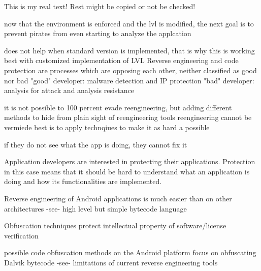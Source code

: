 This is my real text! Rest might be copied or not be checked!


now that the environment is enforced and the lvl is modified, the next goal is to prevent pirates from even starting to analyze the applcation

does not help when standard version is implemented, that is why this is working best with customized implementation of LVL
%
Reverse engineering and code protection are processes which are opposing each other, neither classified as good nor bad\newline
"good" developer: malware detection and IP protection\newline
"bad" developer: analysis for attack and analysis resistance

\cite{kovachevaMaster}
%
it is not possible to 100 percent evade reengineering, but adding different methods to hide from plain sight of reengineering tools
%
reengineering cannot be vermiede
best is to apply technqiues to make it as hard a possible
\cite{munteanLicense}
%

if they do not see what the app is doing, they cannot fix it

Application developers are interested in protecting their applications. Protection in this case means that it should be hard to understand
what an application is doing and how its functionalities are implemented.\newline


Reverse engineering of Android applications is much easier than on other architectures -see- high level but simple bytecode language\newline

Obfuscation techniques protect intellectual property of software/license verification\newline

possible code obfuscation methods on the Android platform focus on obfuscating Dalvik bytecode -see- limitations of current reverse engineering tools\newline
